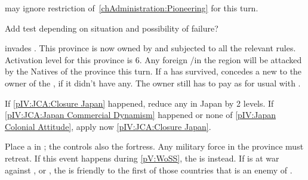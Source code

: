 \phadm
\aparag \RUS may ignore restriction of~\ref{chAdministration:Pioneering} for
this turn.





\begin{todo}
  Add test depending on situation and possibility of failure?
\end{todo}

\phevnt
\aparag \paysChina invades \granderegionFormose.  This province is now owned
by \paysChina and subjected to all the relevant rules. Activation level for
this province is 6.
\aparag Any foreign \TP/\COL in the region will be attacked by the Natives of
the province this turn.
\aparag If a \TP has survived,  concedes a new \dipAT to the owner
of the \TP, if it didn't have any. The owner still has to pay as for usual
\dipAT with \paysChine.





\phevnt{}
\aparag If \ref{pIV:JCA:Closure Japan} happened, reduce any \TP in Japan by 2
levels.
\aparag If \ref{pIV:JCA:Japan Commercial Dynamism} happened or none of
\ref{pIV:Japan Colonial Attitude}, apply now \ref{pIV:JCA:Closure Japan}.










\phevnt
\aparag Place a \REVOLT \facemoins in \provinceCatalunya ; the \REVOLT
controls also the fortress. Any military force in the province must retreat.
\bparag If this event happens during \ref{pV:WoSS}, the \REVOLT is \faceplus
instead.
\aparag If \SPA is at war against \FRA, \ENG or \AUT, the \REVOLT is friendly
to the first of those countries that is an enemy of \SPA.

